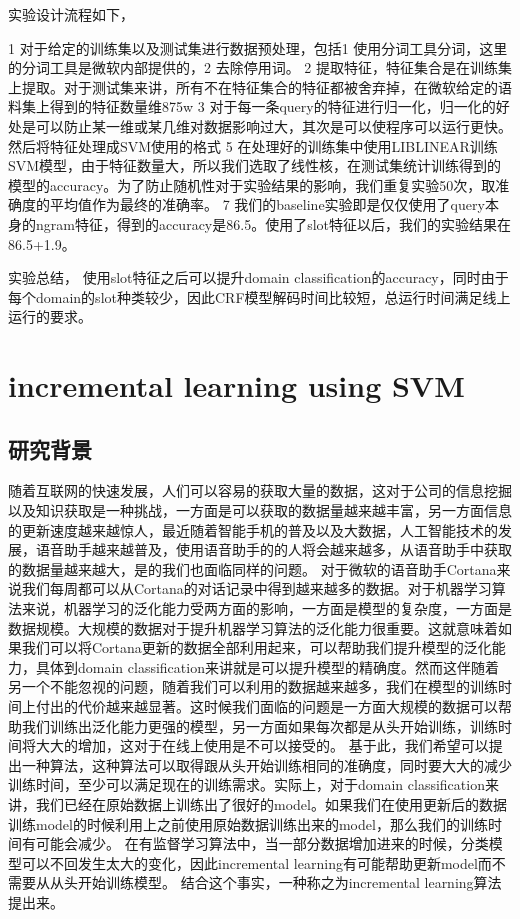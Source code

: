 \documentclass[master]{njuthesis}
\begin{document}
实验设计流程如下，

1 对于给定的训练集以及测试集进行数据预处理，包括1 使用分词工具分词，这里的分词工具是微软内部提供的，2 去除停用词。
2 提取特征，特征集合是在训练集上提取。对于测试集来讲，所有不在特征集合的特征都被舍弃掉，在微软给定的语料集上得到的特征数量维875w
3 对于每一条query的特征进行归一化，归一化的好处是可以防止某一维或某几维对数据影响过大，其次是可以使程序可以运行更快。然后将特征处理成SVM使用的格式
5 在处理好的训练集中使用LIBLINEAR训练SVM模型，由于特征数量大，所以我们选取了线性核，在测试集统计训练得到的模型的accuracy。为了防止随机性对于实验结果的影响，我们重复实验50次，取准确度的平均值作为最终的准确率。
7 我们的baseline实验即是仅仅使用了query本身的ngram特征，得到的accuracy是86.5。使用了slot特征以后，我们的实验结果在86.5+1.9。

实验总结，
    使用slot特征之后可以提升domain classification的accuracy，同时由于每个domain的slot种类较少，因此CRF模型解码时间比较短，总运行时间满足线上运行的要求。


\chapter{incremental learning using SVM}\label{chapter_smallworld}

\section{研究背景}

随着互联网的快速发展，人们可以容易的获取大量的数据，这对于公司的信息挖掘以及知识获取是一种挑战，一方面是可以获取的数据量越来越丰富，另一方面信息的更新速度越来越惊人，最近随着智能手机的普及以及大数据，人工智能技术的发展，语音助手越来越普及，使用语音助手的的人将会越来越多，从语音助手中获取的数据量越来越大，是的我们也面临同样的问题。
对于微软的语音助手Cortana来说我们每周都可以从Cortana的对话记录中得到越来越多的数据。对于机器学习算法来说，机器学习的泛化能力受两方面的影响，一方面是模型的复杂度，一方面是数据规模。大规模的数据对于提升机器学习算法的泛化能力很重要。这就意味着如果我们可以将Cortana更新的数据全部利用起来，可以帮助我们提升模型的泛化能力，具体到domain classification来讲就是可以提升模型的精确度。然而这伴随着另一个不能忽视的问题，随着我们可以利用的数据越来越多，我们在模型的训练时间上付出的代价越来越显著。这时候我们面临的问题是一方面大规模的数据可以帮助我们训练出泛化能力更强的模型，另一方面如果每次都是从头开始训练，训练时间将大大的增加，这对于在线上使用是不可以接受的。
基于此，我们希望可以提出一种算法，这种算法可以取得跟从头开始训练相同的准确度，同时要大大的减少训练时间，至少可以满足现在的训练需求。实际上，对于domain classification来讲，我们已经在原始数据上训练出了很好的model。如果我们在使用更新后的数据训练model的时候利用上之前使用原始数据训练出来的model，那么我们的训练时间有可能会减少。
在有监督学习算法中，当一部分数据增加进来的时候，分类模型可以不回发生太大的变化，因此incremental learning有可能帮助更新model而不需要从从头开始训练模型。
结合这个事实，一种称之为incremental learning算法提出来。
\end{document}
